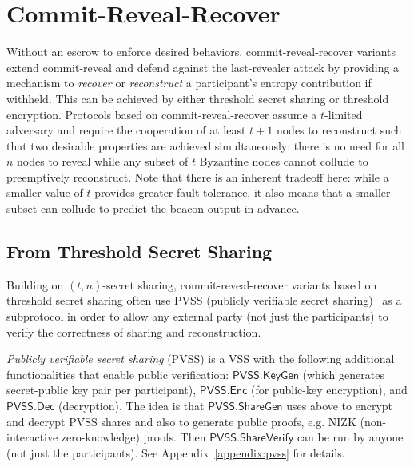 
\section{Commit-Reveal-Recover}
\label{section:commit-reveal-recover}
Without an escrow to enforce desired behaviors, commit-reveal-recover variants extend commit-reveal and defend against the last-revealer attack by providing a mechanism to \textit{recover} or \textit{reconstruct} a participant's entropy contribution if withheld. This can be achieved by either threshold secret sharing or threshold encryption. Protocols based on commit-reveal-recover assume a $t$-limited adversary and require the cooperation of at least $t + 1$ nodes to reconstruct such that two desirable properties are achieved simultaneously: there is no need for all $n$ nodes to reveal while any subset of $t$ Byzantine nodes cannot collude to preemptively reconstruct. Note that there is an inherent tradeoff here: while a smaller value of $t$ provides greater fault tolerance, it also means that a smaller subset can collude to predict the beacon output in advance.

\subsection{From Threshold Secret Sharing}
Building on $(t, n)$-secret sharing, commit-reveal-recover variants based on threshold secret sharing often use PVSS (publicly verifiable secret sharing)~\cite{schoenmakers1999simple, cascudo2017scrape} as a subprotocol in order to allow any external party (not just the participants) to verify the correctness of sharing and reconstruction.

\begin{definition}
\textit{Publicly verifiable secret sharing} (PVSS) is a VSS with the following additional functionalities that enable public verification: $\mathsf{PVSS.KeyGen}$ (which generates secret-public key pair per participant), $\mathsf{PVSS.Enc}$ (for public-key encryption), and $\mathsf{PVSS.Dec}$ (decryption).
The idea is that $\mathsf{PVSS.ShareGen}$ uses above to encrypt and decrypt PVSS shares and also to generate public proofs, e.g. NIZK (non-interactive zero-knowledge) proofs.
Then $\mathsf{PVSS.ShareVerify}$ can be run by anyone (not just the participants).
See Appendix~\ref{appendix:pvss} for details.
\end{definition}

